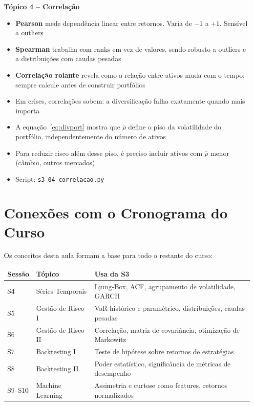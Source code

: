 \documentclass[11pt,a4paper]{article}
\newcommand{\code}[1]{%
  \colorbox{quantlightgray}{\texttt{\small\color{quantdark}#1}}%
}
\theoremstyle{quant}
\begin{document}
\begin{caixaresumo}
\textbf{Tópico 4 -- Correlação}
\begin{itemize}
  \item \textbf{Pearson} mede dependência linear entre retornos. Varia de $-1$ a $+1$. Sensível a outliers
  \item \textbf{Spearman} trabalha com ranks em vez de valores, sendo robusto a outliers e a distribuições com caudas pesadas
  \item \textbf{Correlação rolante} revela como a relação entre ativos muda com o tempo; sempre calcule antes de construir portfólios
  \item Em crises, correlações sobem: a diversificação falha exatamente quando mais importa
  \item A equação~\eqref{eq:divport} mostra que $\bar\rho$ define o piso da volatilidade do portfólio, independentemente do número de ativos
  \item Para reduzir risco além desse piso, é preciso incluir ativos com $\bar\rho$ menor (câmbio, outros mercados)
  \item Script: \code{s3\_04\_correlacao.py}
\end{itemize}
\end{caixaresumo}

\newpage

\section{Conexões com o Cronograma do Curso}
\label{sec:conexoes}

Os conceitos desta aula formam a base para todo o restante do curso:

\vspace{0.5em}
\begin{tabularx}{\textwidth}{@{}llX@{}}
\toprule
\textcolor{quantpurple}{\textbf{Sessão}} &
\textcolor{quantpurple}{\textbf{Tópico}} &
\textcolor{quantpurple}{\textbf{Usa da S3}} \\
\midrule
S4  & Séries Temporais    & Ljung-Box, ACF, agrupamento de volatilidade, GARCH \\[3pt]
S5  & Gestão de Risco I   & VaR histórico e paramétrico, distribuições, caudas pesadas \\[3pt]
S6  & Gestão de Risco II  & Correlação, matriz de covariância, otimização de Markowitz \\[3pt]
S7  & Backtesting I       & Teste de hipótese sobre retornos de estratégias \\[3pt]
S8  & Backtesting II      & Poder estatístico, significância de métricas de desempenho \\[3pt]
S9--S10 & Machine Learning & Assimetria e curtose como features, retornos normalizados \\
\bottomrule
\end{tabularx}
\end{document}
